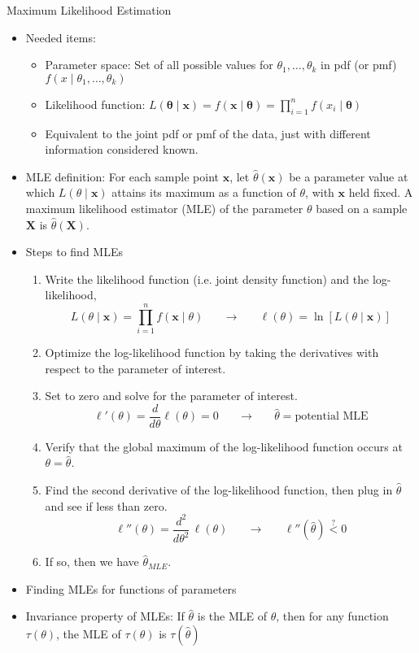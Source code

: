 \documentclass{article}
\begin{document}
Maximum Likelihood Estimation
\begin{itemize}
    \item Needed items:
    \begin{itemize}
        \item Parameter space: Set of all possible values for $\theta_1, \ldots, \theta_k$ in pdf (or pmf) $f(x \mid \theta_1, \ldots, \theta_k)$ 
        \item Likelihood function: $L(\boldsymbol{\theta} \mid \mathbf{x}) = f(\mathbf{x} \mid \boldsymbol{\theta}) = \displaystyle \prod_{i = 1}^n f(x_i \mid \boldsymbol{\theta})$
        \item[] Equivalent to the joint pdf or pmf of the data, just with different information considered known.
    \end{itemize}
    \item MLE definition: For each sample point $\mathbf{x}$, let $\hat{\theta}(\boldsymbol{x})$ be a parameter value at which $L(\theta \mid \mathbf{x})$ attains its maximum as a function of $\theta$, with $\mathbf{x}$ held fixed. A maximum likelihood estimator (MLE) of the parameter $\theta$ based on a sample $\mathbf{X}$ is $\hat{\theta}(\mathbf{X})$.
    \item Steps to find MLEs
    \begin{enumerate}
        \item Write the likelihood function (i.e. joint density function) and the log-likelihood,
        \[L(\theta \mid \mathbf{x}) = \prod_{i = 1}^n f(\mathbf{x} \mid \theta) \hspace{20pt} \rightarrow \hspace{20pt} \ell(\theta) = \ln[L(\theta \mid \mathbf{x})]\]
        \item Optimize the log-likelihood function by taking the derivatives with respect to the parameter of interest.
        \item[] Set to zero and solve for the parameter of interest.
        \[\ell'(\theta) = \frac{d}{d \theta} \ell(\theta) = 0 \hspace{20pt} \rightarrow \hspace{20pt} \hat{\theta} = \text{potential MLE}\]
        \item Verify that the global maximum of the log-likelihood function occurs at $\theta = \hat{\theta}$.
        \item[] Find the second derivative of the log-likelihood function, then plug in $\hat{\theta}$ and see if less than zero.
        \[\ell''(\theta) = \frac{d^2}{d \theta^2} \, \ell(\theta) \hspace{20pt} \rightarrow \hspace{20pt} \ell''(\hat{\theta}) \overset{?}< 0\]
        \item[] If so, then we have $\hat{\theta}_{MLE}$.
    \end{enumerate}\bigskip
    \item Finding MLEs for functions of parameters
    \item[] Invariance property of MLEs: If $\hat{\theta}$ is the MLE of $\theta$, then for any function $\tau(\theta)$, the MLE of $\tau(\theta)$ is $\tau(\hat\theta)$
\end{itemize}\bigskip
\end{document}
